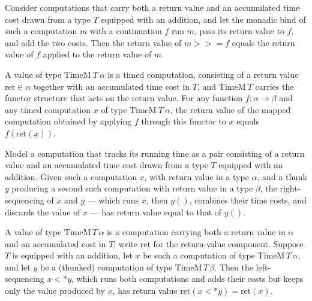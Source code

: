 \begin{theorem}
\label{TimeM.ret_bind}
\leanok
{}
Consider computations that carry both a return value and an accumulated time cost drawn
from a type $T$ equipped with an addition, and let the monadic bind of such a
computation $m$ with a continuation $f$ run $m$, pass its return value to $f$, and add
the two costs. Then the return value of $m \mathbin{>\!\!>\!\!=} f$ equals the return
value of $f$ applied to the return value of $m$.
\end{theorem}

\begin{theorem}
\label{TimeM.ret_map}
\leanok
{}
A value of type $\mathrm{TimeM}\ T\ \alpha$ is a timed computation, consisting of a
return value $\mathrm{ret} \in \alpha$ together with an accumulated time cost in $T$,
and $\mathrm{TimeM}\ T$ carries the functor structure that acts on the return value. For
any function $f : \alpha \to \beta$ and any timed computation $x$ of type
$\mathrm{TimeM}\ T\ \alpha$, the return value of the mapped computation obtained by
applying $f$ through this functor to $x$ equals $f(\mathrm{ret}(x))$.
\end{theorem}

\begin{theorem}
\label{TimeM.ret_seqRight}
\leanok
{}
Model a computation that tracks its running time as a pair consisting of a return value
and an accumulated time cost drawn from a type $T$ equipped with an addition. Given such
a computation $x$, with return value in a type $\alpha$, and a thunk $y$ producing a
second such computation with return value in a type $\beta$, the right-sequencing of $x$
and $y$ — which runs $x$, then $y()$, combines their time costs, and discards the value
of $x$ — has return value equal to that of $y()$.
\end{theorem}

\begin{theorem}
\label{TimeM.ret_seqLeft}
\leanok
{}
A value of type $\mathrm{TimeM}\,T\,\alpha$ is a computation carrying both a return
value in $\alpha$ and an accumulated cost in $T$; write $\mathrm{ret}$ for the
return-value component. Suppose $T$ is equipped with an addition, let $x$ be such a
computation of type $\mathrm{TimeM}\,T\,\alpha$, and let $y$ be a (thunked) computation
of type $\mathrm{TimeM}\,T\,\beta$. Then the left-sequencing $x \mathbin{<{*}} y$, which
runs both computations and adds their costs but keeps only the value produced by $x$,
has return value $\mathrm{ret}(x \mathbin{<{*}} y) = \mathrm{ret}(x)$.
\end{theorem}

